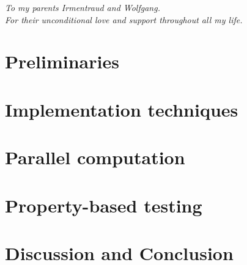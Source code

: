 \documentclass[oneside]{book}
\begin{document}
\clearpage
\begin{center}
    \thispagestyle{empty}
    \vspace*{\fill}
    \textit{To my parents Irmentraud and Wolfgang. \\ For their unconditional love and support throughout all my life.}
    \vspace*{\fill}
\end{center}

\clearpage


\epigraphhead[450]{}
\part{Preliminaries}
\label{part:preliminaries}




\epigraphhead[450]{}
\part{Implementation techniques}
\label{part:implementation}



\epigraphhead[450]{}
\part{Parallel computation}
\label{part:parallel}


\epigraphhead[450]{}
\part{Property-based testing}
\label{part:property}


\epigraphhead[450]{}
\part{Discussion and Conclusion}
\label{part:discussion}



\renewcommand\bibname{References}



\end{document}

